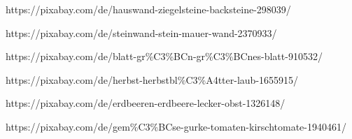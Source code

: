 \documentclass{Paper}
\begin{document}
\begin{appendix}
https://pixabay.com/de/hauswand-ziegelsteine-backsteine-298039/



https://pixabay.com/de/steinwand-stein-mauer-wand-2370933/



https://pixabay.com/de/blatt-gr\%C3\%BCn-gr\%C3\%BCnes-blatt-910532/



https://pixabay.com/de/herbst-herbstbl\%C3\%A4tter-laub-1655915/



https://pixabay.com/de/erdbeeren-erdbeere-lecker-obst-1326148/



https://pixabay.com/de/gem\%C3\%BCse-gurke-tomaten-kirschtomate-1940461/

\end{appendix}

\vfill %
\end{document}
